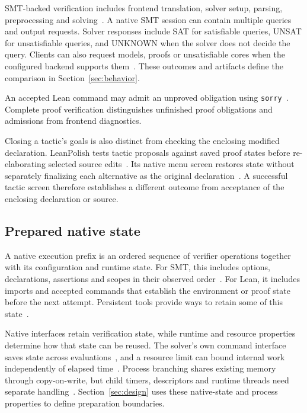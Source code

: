 \documentclass[10pt,twocolumn]{article}
\begin{document}
SMT-backed verification includes frontend translation, solver setup, parsing, preprocessing and solving~\cite{verus,z3api}. A native SMT session can contain multiple queries and output requests. Solver responses include SAT for satisfiable queries, UNSAT for unsatisfiable queries, and UNKNOWN when the solver does not decide the query. Clients can also request models, proofs or unsatisfiable cores when the configured backend supports them~\cite{z3api}. These outcomes and artifacts define the comparison in Section~\ref{sec:behavior}.

An accepted Lean command may admit an unproved obligation using \texttt{sorry}~\cite{repl}. Complete proof verification distinguishes unfinished proof obligations and admissions from frontend diagnostics.

Closing a tactic's goals is also distinct from checking the enclosing modified declaration. LeanPolish tests tactic proposals against saved proof states before re-elaborating selected source edits~\cite{leanpolishPaper}. Its native menu screen restores state without separately finalizing each alternative as the original declaration~\cite{leanpolishSource}. A successful tactic screen therefore establishes a different outcome from acceptance of the enclosing declaration or source.

\subsection{Prepared native state}
A native execution prefix is an ordered sequence of verifier operations together with its configuration and runtime state. For SMT, this includes options, declarations, assertions and scopes in their observed order~\cite{z3api}. For Lean, it includes imports and accepted commands that establish the environment or proof state before the next attempt. Persistent tools provide ways to retain some of this state~\cite{repl,leanSnapshot}.

Native interfaces retain verification state, while runtime and resource properties determine how that state can be reused. The solver's own command interface saves state across evaluations~\cite{z3api}, and a resource limit can bound internal work independently of elapsed time~\cite{z3params}. Process branching shares existing memory through copy-on-write, but child timers, descriptors and runtime threads need separate handling~\cite{fork}. Section~\ref{sec:design} uses these native-state and process properties to define preparation boundaries.
\end{document}
